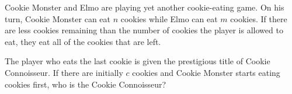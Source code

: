 Cookie Monster and Elmo are playing yet another cookie-eating game. On his turn, Cookie Monster can eat $n$ cookies while Elmo can eat $m$ cookies. If there are less cookies remaining than the number of cookies the player is allowed to eat, they eat all of the cookies that are left. 

The player who eats the last cookie is given the prestigious title of Cookie Connoisseur. If there are initially $c$ cookies and Cookie Monster starts eating cookies first, who is the Cookie Connoisseur?
